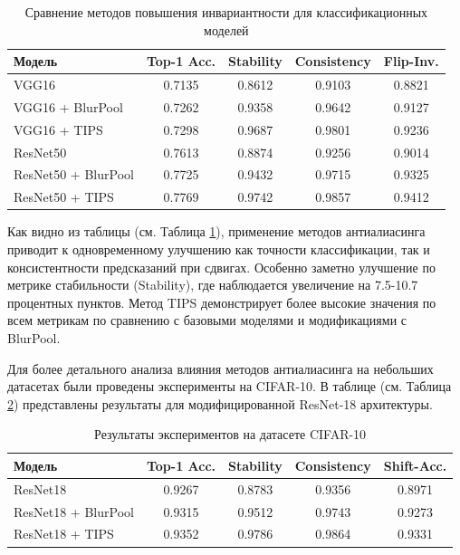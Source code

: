 \begin{table}[h]
\centering
\begin{tabular}{|l|c|c|c|c|}
\hline
\textbf{Модель} & \textbf{Top-1 Acc.} & \textbf{Stability} & \textbf{Consistency} & \textbf{Flip-Inv.} \\
\hline
VGG16 & 0.7135 & 0.8612 & 0.9103 & 0.8821 \\
VGG16 + BlurPool & 0.7262 & 0.9358 & 0.9642 & 0.9127 \\
VGG16 + TIPS & 0.7298 & 0.9687 & 0.9801 & 0.9236 \\
\hline
ResNet50 & 0.7613 & 0.8874 & 0.9256 & 0.9014 \\
ResNet50 + BlurPool & 0.7725 & 0.9432 & 0.9715 & 0.9325 \\
ResNet50 + TIPS & 0.7769 & 0.9742 & 0.9857 & 0.9412 \\
\hline
\end{tabular}
\caption{Сравнение методов повышения инвариантности для классификационных моделей}
\label{tab:classification_models}
\end{table}

Как видно из таблицы (см. Таблица \ref{tab:classification_models}), применение методов антиалиасинга приводит к одновременному улучшению как точности классификации, так и консистентности предсказаний при сдвигах. Особенно заметно улучшение по метрике стабильности (Stability), где наблюдается увеличение на 7.5-10.7 процентных пунктов. Метод TIPS демонстрирует более высокие значения по всем метрикам по сравнению с базовыми моделями и модификациями с BlurPool.

Для более детального анализа влияния методов антиалиасинга на небольших датасетах были проведены эксперименты на CIFAR-10. В таблице (см. Таблица \ref{tab:cifar_results}) представлены результаты для модифицированной ResNet-18 архитектуры.

\begin{table}[h]
\centering
\begin{tabular}{|l|c|c|c|c|}
\hline
\textbf{Модель} & \textbf{Top-1 Acc.} & \textbf{Stability} & \textbf{Consistency} & \textbf{Shift-Acc.} \\
\hline
ResNet18 & 0.9267 & 0.8783 & 0.9356 & 0.8971 \\
ResNet18 + BlurPool & 0.9315 & 0.9512 & 0.9743 & 0.9273 \\
ResNet18 + TIPS & 0.9352 & 0.9786 & 0.9864 & 0.9331 \\
\hline
\end{tabular}
\caption{Результаты экспериментов на датасете CIFAR-10}
\label{tab:cifar_results}
\end{table}

